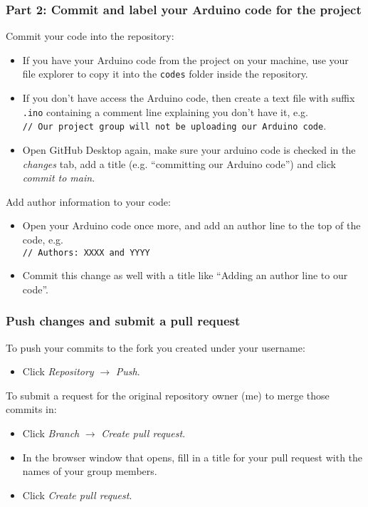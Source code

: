 \documentclass[
9pt,
handout,
]{beamer}
\begin{document}
\begin{frame}
  \frametitle{Part 2: Commit and label your Arduino code for the project}
  Commit your code into the repository:
  \begin{itemize}
    \item If you have your Arduino code from the project on your machine, use your file explorer to copy it into the \texttt{codes} folder inside the repository.
    \item If you don't have access the Arduino code, then create a text file with suffix \texttt{.ino} containing a comment line explaining you don't have it, e.g. \\ \texttt{// Our project group will not be uploading our Arduino code}.
    \item Open GitHub Desktop again, make sure your arduino code is checked in the \emph{changes} tab, add a title (e.g. ``committing our Arduino code'') and click \emph{commit to main}.
  \end{itemize}
  Add author information to your code:
  \begin{itemize}
    \item Open your Arduino code once more, and add an author line to the top of the code, e.g. \\ \texttt{// Authors: XXXX and YYYY}
    \item Commit this change as well with a title like ``Adding an author line to our code''.
  \end{itemize}
\end{frame}
%
\begin{frame}
  \frametitle{Push changes and submit a pull request}
  To push your commits to the fork you created under your username:
  \begin{itemize}
    \item Click \emph{Repository} $\rightarrow$ \emph{Push}.
  \end{itemize}
  To submit a request for the original repository owner (me) to merge those commits in:
  \begin{itemize}
    \item Click \emph{Branch} $\rightarrow$ \emph{Create pull request}.
    \item In the browser window that opens, fill in a title for your pull request with the names of your group members.
    \item Click \emph{Create pull request}.
  \end{itemize}
\end{frame}
%
\end{document}
